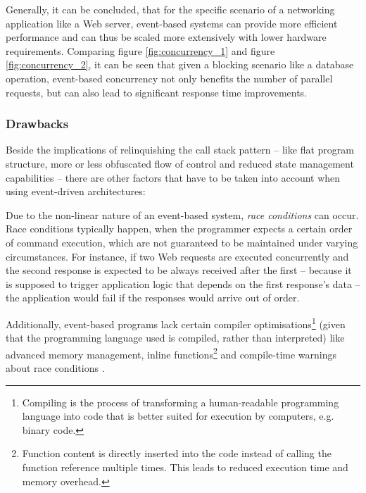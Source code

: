 Generally, it can be concluded, that for the specific scenario of a networking application like a Web server, event-based systems can provide more efficient performance and can thus be scaled more extensively with lower hardware requirements. Comparing figure \ref{fig:concurrency_1} and figure \ref{fig:concurrency_2}, it can be seen that given a blocking scenario like a database operation, event-based concurrency not only benefits the number of parallel requests, but can also lead to significant response time improvements.

\subsubsection*{Drawbacks}
Beside the implications of relinquishing the call stack pattern -- like flat program structure, more or less obfuscated flow of control and reduced state management capabilities -- there are other factors that have to be taken into account when using event-driven architectures: 

Due to the non-linear nature of an event-based system, \textit{race conditions} can occur. Race conditions typically happen, when the programmer expects a certain order of command execution, which are not guaranteed to be maintained under varying circumstances. For instance, if two Web requests are executed concurrently and the second response is expected to be always received after the first -- because it is supposed to trigger application logic that depends on the first response's data -- the application would fail if the responses would arrive out of order.

Additionally, event-based programs lack certain compiler optimisations\footnote{Compiling is the process of transforming a human-readable programming language into code that is better suited for execution by computers, e.g. binary code.} (given that the programming language used is compiled, rather than interpreted) like advanced memory management, inline functions\footnote{Function content is directly inserted into the code instead of calling the function reference multiple times. This leads to reduced execution time and memory overhead.} and compile-time warnings about race conditions \cite[p. 5]{Behren2003}.


